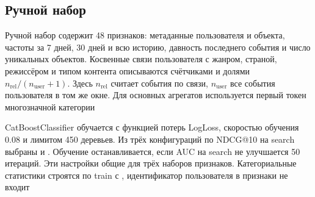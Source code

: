 \subsection{Ручной набор}

Ручной набор содержит 48 признаков: метаданные пользователя и объекта,
частоты за 7 дней, 30 дней и всю историю, давность последнего события
и число уникальных объектов. Косвенные связи пользователя с жанром,
страной, режиссёром и типом контента описываются счётчиками и долями
\(n_{\mathrm{rel}}/(n_{\mathrm{user}}+1)\).
Здесь \(n_{\mathrm{rel}}\) считает события по связи,
\(n_{\mathrm{user}}\) все события пользователя в том же окне.
Для основных агрегатов используется первый токен многозначной категории

CatBoostClassifier обучается с функцией потерь LogLoss, скоростью обучения
0.08 и лимитом 450 деревьев. Из трёх конфигураций по NDCG@10 на search
выбраны  и .
Обучение останавливается, если AUC на search не улучшается 50 итераций.
Эти настройки общие для трёх наборов признаков.
Категориальные статистики строятся по train с
, идентификатор пользователя в признаки не входит
